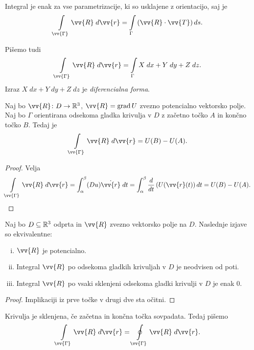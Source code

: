 \begin{opomba}
Integral je enak za vse parametrizacije, ki so usklajene z
orientacijo, saj je
\[
\lint_{\vv{\Gamma}} \vv{R}\;d\vv{r} =
\lint_\Gamma \left(\vv{R} \cdot \vv{T}\right)ds.
\]
\end{opomba}

\begin{opomba}
Pišemo tudi
\[
\lint_{\vv{\Gamma}} \vv{R}\;d\vv{r} =
\lint_\Gamma X\;dx + Y\;dy + Z\;dz.
\]
Izraz $X\;dx + Y\;dy + Z\;dz$ je \emph{diferencialna forma}.
\end{opomba}

\begin{trditev}
Naj bo $\vv{R} \colon D \to \R^3$, $\vv{R} = \grad U$ zvezno
potencialno vektorsko polje. Naj bo $\Gamma$ orientirana odsekoma
gladka krivulja v $D$ z začetno točko $A$ in končno točko $B$.
Tedaj je
\[
\lint_{\vv{\Gamma}} \vv{R}\;d\vv{r} =
U(B) - U(A).
\]
\end{trditev}

\begin{proof}
Velja
\[
\lint_{\vv{\Gamma}} \vv{R}\;d\vv{r} =
\int_\alpha^\beta (Du) \dot{\vv{r}}\;dt =
\int_\alpha^\beta \frac{d}{dt} \left(U(\vv{r}(t)\right)dt =
U(B) - U(A). \qedhere
\]
\end{proof}

\begin{izrek}
Naj bo $D \subseteq \mathbb{R}^3$ odprta in $\vv{R}$ zvezno vektorsko polje
na $D$. Naslednje izjave so ekvivalentne:

\begin{enumerate}[i)]
\item $\vv{R}$ je potencialno.
\item Integral $\vv{R}$ po odsekoma gladkih krivuljah v $D$ je
neodvisen od poti.
\item Integral $\vv{R}$ po vsaki sklenjeni odsekoma gladki krivulji
v $D$ je enak $0$.
\end{enumerate}
\end{izrek}

\begin{proof}
Implikaciji iz prve točke v drugi dve sta očitni.
\end{proof}

\begin{opomba}
Krivulja je sklenjena, če začetna in končna točka sovpadata. Tedaj
pišemo
\[
\lint_{\vv{\Gamma}} \vv{R}\;d\vv{r} =
\olint_{\vv{\Gamma}} \vv{R}\;d\vv{r}.
\]
\end{opomba}
